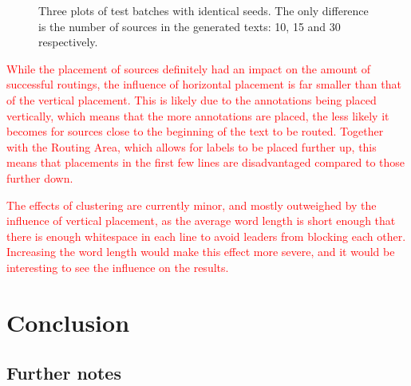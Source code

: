 \documentclass[11pt,a4paper]{vutinfth}
\newcommand{\change}[1]{\textcolor{red}{#1}}
\begin{document}
\begin{figure}
 	\caption{Three plots of test batches with identical seeds. The only difference is the number of sources in the generated texts: 10, 15 and 30 respectively.}
 	\label{fig:uniformstats}
 \end{figure}

\change{While the placement of sources definitely had an impact on the amount of successful routings, the influence of horizontal placement is far smaller than that of the vertical placement. This is likely due to the annotations being placed vertically, which means that the more annotations are placed, the less likely it becomes for sources close to the beginning of the text to be routed. Together with the Routing Area, which allows for labels to be placed further up, this means that placements in the first few lines are disadvantaged compared to those further down.}

\change{The effects of clustering are currently minor, and mostly outweighed by the influence of vertical placement, as the average word length is short enough that there is enough whitespace in each line to avoid leaders from blocking each other. Increasing the word length would make this effect more severe, and it would be interesting to see the influence on the results.}

\chapter{Conclusion}

\section{Further notes}





\backmatter %



\end{document}
